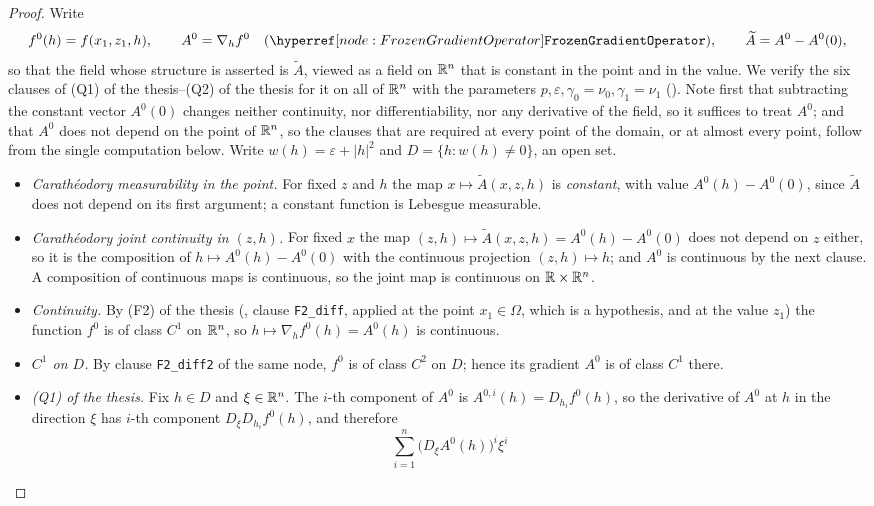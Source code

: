 \begin{proof}
Write
\[
f^0(h)=f(x_1,z_1,h),\qquad
A^0=\nabla_hf^0\quad(\noderef{FrozenGradientOperator}),\qquad
\widetilde A=A^0-A^0(0),
\]
so that the field whose structure is asserted is $\widetilde A$, viewed as a
field on $\mathbb{R}^n$ that is constant in the point and in the value.  We verify the
six clauses of (Q1) of the thesis--(Q2) of the thesis for it on all of $\mathbb{R}^n$ with the
parameters $p,\varepsilon,\gamma_0=\nu_0,\gamma_1=\nu_1$
().  Note first that subtracting the constant vector
$A^0(0)$ changes neither continuity, nor differentiability, nor any derivative
of the field, so it suffices to treat $A^0$; and that $A^0$ does not depend on
the point of $\mathbb{R}^n$, so the clauses that are required at every point of the
domain, or at almost every point, follow from the single computation below.
Write $w(h)=\varepsilon+|h|^2$ and $D=\{h:w(h)\ne0\}$, an open set.
\begin{itemize}
\item \emph{Carath\'eodory measurability in the point.}  For fixed $z$ and $h$
  the map $x\mapsto\widetilde A(x,z,h)$ is \emph{constant}, with value
  $A^0(h)-A^0(0)$, since $\widetilde A$ does not depend on its first argument;
  a constant function is Lebesgue measurable.
\item \emph{Carath\'eodory joint continuity in $(z,h)$.}  For fixed $x$ the map
  $(z,h)\mapsto\widetilde A(x,z,h)=A^0(h)-A^0(0)$ does not depend on $z$ either,
  so it is the composition of $h\mapsto A^0(h)-A^0(0)$ with the continuous
  projection $(z,h)\mapsto h$; and $A^0$ is continuous by the next clause.  A
  composition of continuous maps is continuous, so the joint map is continuous
  on $\mathbb{R}\times\mathbb{R}^n$.
\item \emph{Continuity.}  By (F2) of the thesis
  (, clause \texttt{F2\_diff}, applied at the
  point $x_1\in\Omega$, which is a hypothesis, and at the value $z_1$) the function $f^0$ is of class $C^1$ on $\mathbb{R}^n$, so
  $h\mapsto\nabla_hf^0(h)=A^0(h)$ is continuous.
\item \emph{$C^1$ on $D$.}  By clause \texttt{F2\_diff2} of the same node,
  $f^0$ is of class $C^2$ on $D$; hence its gradient $A^0$ is of class $C^1$
  there.
\item \emph{(Q1) of the thesis.}  Fix $h\in D$ and $\xi\in\mathbb{R}^n$.  The $i$-th
  component of $A^0$ is $A^{0,i}(h)=D_{h_i}f^0(h)$, so the derivative of $A^0$
  at $h$ in the direction $\xi$ has $i$-th component $D_\xi D_{h_i}f^0(h)$, and
  therefore
  \[
  \sum_{i=1}^n\bigl(D_\xi A^0(h)\bigr)^i\xi^i
\]
\end{itemize}
\end{proof}
